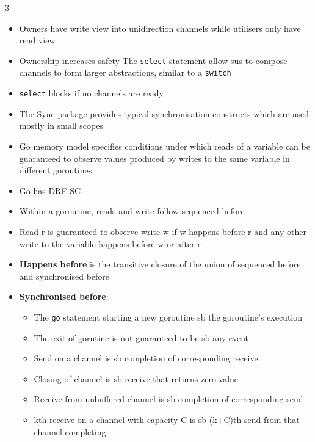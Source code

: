 \documentclass[10pt, landscape]{article}
\begin{document}
\begin{multicols*}{3}
\begin{itemize}
    \item Owners have write view into unidirection channels while utilisers only have read view
    \item Ownership increases safety
    The \texttt{select} statement allow sus to compose channels to form larger abstractions, similar to a \texttt{switch}
    \item \texttt{select} blocks if no channels are ready
    \item The Sync package provides typical synchronisation constructs which are used mostly in small scopes
    \item Go memory model specifies conditions under which reads of a variable can be guaranteed to observe values produced by writes to the same variable in different goroutines
    \item Go has DRF-SC
    \item Within a goroutine, reads and write follow sequenced before
    \item Read r is guaranteed to observe write w if w happens before r and any other write to the variable happens before w or after r
    \item \textbf{Happens before} is the transitive closure of the union of sequenced before and synchronised before
    \item \textbf{Synchronised before}:
    \begin{itemize}
        \item The \texttt{go} statement starting a new goroutine sb the goroutine's execution
        \item The exit of gorutine is not guaranteed to be sb any event
        \item Send on a channel is sb completion of corresponding receive
        \item Closing of channel is sb receive that returns zero value
        \item Receive from unbuffered channel is sb completion of corresponding send
        \item kth receive on a channel with capacity C is sb (k+C)th send from that channel completing
    \end{itemize}
\end{itemize}


\end{multicols*}
\end{document}
